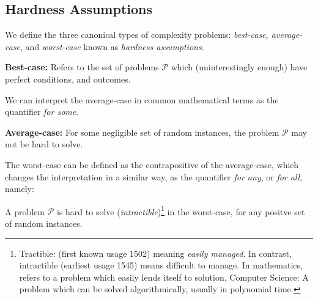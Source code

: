 \subsection{Hardness Assumptions}


We define the three canonical types of complexity problems: \emph{best-case, average-case}, and \emph{worst-case} known as \emph{hardness assumptions}. 

\begin{defn}
    \textbf{Best-case:} 
    Refers to the set of problems $\mathcal{P}$ which (uninterestingly enough) have perfect conditions, and outcomes.
\end{defn}


We can interpret the average-case in common mathematical terms as the quantifier \emph{for some}.

\begin{defn}
    \textbf{Average-case:} 
For some negligible set of random instances, the problem $\mathcal{P}$ may not be hard to solve. 
\end{defn}


The worst-case can be defined as the contrapositive of the average-case, which changes the interpretation in a similar way, as the quantifier \emph{for any}, or \emph{for all}, namely:

\begin{defn}
A problem $\mathcal{P}$ is hard to solve (\emph{intractible})\footnote{Tractible: (first known usage 1502) meaning \textit{easily managed}. In contrast, intractible (earliest usage 1545) means difficult to manage. In mathematics, refers to a problem which easily lends itself to solution. Computer Science: A problem which can be solved algorithmically, usually in polynomial time. } in the worst-case, for any positve set of random instances.
\end{defn}
